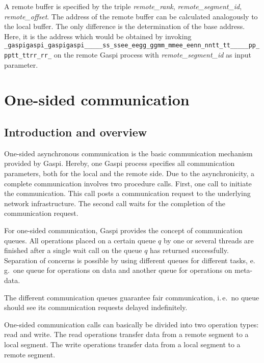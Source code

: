 \documentclass[a4paper]{article}
\makeatletter
\newlength{\st}\setlength{\st}{0pt}
\newcommand{\zerowsep}{\hskip 0pt plus 0.1pt minus 0.1pt}
\newcommand{\ZSEP}[1]{\ifx#1\@@@EOZ@@@\let\next\relax\else\ifx#1\_#1\zerowsep\else#1\fi\let\next\ZSEP\fi\next}
\newcommand{\zsep}[1]{\ZSEP{}#1\@@@EOZ@@@}
\newcommand{\gaspiprefix}{gaspi}
\newcommand{\GASPI}{{\sc Gaspi}}
\newcommand{\function}[1]{{\tt #1}}
\newcommand{\parameter}[1]{{\it #1}}
\newcommand{\gaspifunction}[1]{\function{\protect\zsep{\gaspiprefix\_#1}}}
\makeatother
\begin{document}
A remote buffer is specified by the triple \parameter{remote\_rank}, \parameter{remote\_segment\_id},
\parameter{remote\_offset}.
The address of the remote  buffer can be calculated analogously to the local buffer. The only
difference is the determination of the base address. Here, it is the address
which would be obtained by invoking \gaspifunction{segment\_ptr}
on the remote \GASPI{} process with \parameter{remote\_segment\_id} as input parameter.

\section{One-sided communication}

\subsection{Introduction and overview}

One-sided asynchronous communication is the basic communication
mechanism provided by \GASPI{}. Hereby, one \GASPI{} process specifies
all communication parameters, both for the local and the remote
side. Due to the asynchronicity, a complete communication
involves two procedure calls. First, one call to initiate the
communication. This call posts a communication request to the
underlying network infrastructure. The second call waits for the
completion of the communication request.

For one-sided communication, \GASPI{} provides the concept of communication
queues.  All operations placed on a certain queue $q$ by one or
several threads are finished after a single wait call on the queue $q$ has
returned successfully. Separation of concerns is possible by using different queues
for different tasks, e.\,g.\ one queue for operations on data and
another queue for operations on meta-data.

The different communication queues guarantee fair communication, i.\,e.\ no queue
should see its communication requests delayed indefinitely. 


One-sided communication calls can basically be divided into two
operation types: read and write.
The read operations transfer data from a remote segment
to a local segment. The write operations transfer data from a local segment
to a remote segment.
\end{document}
